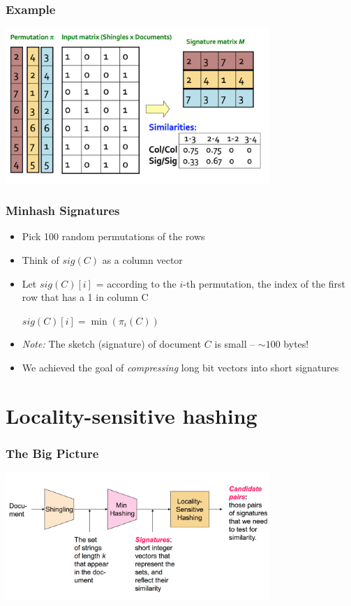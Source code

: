 \documentclass[svgnames]{beamer}
\begin{document}
  
\begin{frame} \frametitle{Example}
\includegraphics[width=10cm]{example}
\end{frame}

  
\begin{frame} \frametitle{Minhash Signatures}

\begin{itemize}
\item Pick 100 random permutations of the rows
\item Think of $sig(C)$ as a column vector
\item Let $sig(C)[i]$ = according to the $i$-th permutation, the index of the first row that has a 1 in column C

\begin{center}   
$sig(C)[i] = \min (\pi_i(C))$
\end{center}

\item \emph{Note:} The sketch (signature) of document $C$ is small -- $\sim 100$ bytes!

\item We achieved the goal of \emph{compressing} long bit vectors into short signatures
\end{itemize}
\end{frame}

  
\section{Locality-sensitive hashing}

  
\begin{frame} \frametitle{The Big Picture}
\includegraphics[width=10cm]{overall}
\end{frame}
\end{document}
